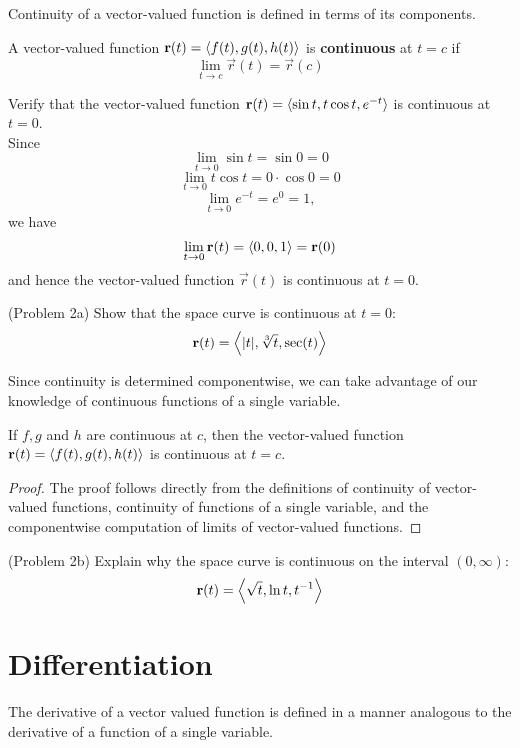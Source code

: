 \documentclass[handout]{ximera}
\begin{document}
Continuity of a vector-valued function is defined in terms of its components.

\begin{definition}
A vector-valued function $\mathbf r(t) = \left\langle f(t), g(t), h(t)\right\rangle$ is
\textbf{continuous} at $t = c$ if
\[
\lim_{t \to c} \vec r(t) = \vec r(c)
\]
\end{definition}

\begin{example}[Example 2]
Verify that the vector-valued function $\mathbf r(t) = \left\langle \sin t, t \cos t, e^{-t}\right\rangle$ is continuous at $t = 0$.\\
Since
\[
\lim_{t \to 0} \sin t =  \sin 0 = 0
\]
\[
\lim_{t \to 0} t \cos t =  0 \cdot \cos 0 = 0
\]
\[
\lim_{t \to 0} e^{-t} =  e^0 = 1,
\]
we have
\[
\lim_{t \to 0} \mathbf r(t) = \left\langle 0, 0, 1\right\rangle = \mathbf r(0)
\]
and hence the vector-valued function $\vec r(t)$ is continuous at $t = 0$.

\end{example}

\begin{problem}(Problem 2a)
Show that the space curve is continuous at $t = 0$:
\[
\mathbf r(t) = \left\langle |t|,\sqrt[3] t, \sec(t)\right\rangle
\]
\end{problem}

Since continuity is determined componentwise, we can take advantage of our knowledge of 
continuous functions of a single variable.

\begin{proposition}[Continuity]
If $f, g$ and $h$ are continuous at $c$, then the vector-valued function $\mathbf r(t) = \left\langle f(t), g(t), h(t)\right\rangle$
is continuous at $t = c$.
\end{proposition}
\begin{proof}
The proof follows directly from the definitions of continuity of vector-valued functions, continuity of functions of a single 
variable, and the componentwise computation of limits of vector-valued functions.
\end{proof}

\begin{problem}(Problem 2b)
Explain why the space curve is continuous on the interval $(0, \infty)$:
\[
\mathbf r(t) = \left\langle  \sqrt t, \ln t, t^{-1}\right\rangle
\]
\end{problem}

\section{Differentiation}
The derivative of a vector valued function is defined in a manner analogous to the derivative of a function of a single variable.
\end{document}
